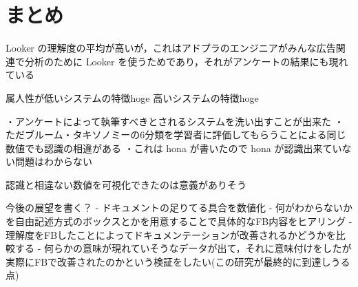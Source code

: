 \section{まとめ}
Looker の理解度の平均が高いが，これはアドプラのエンジニアがみんな広告関連で分析のために Looker を使うためであり，それがアンケートの結果にも現れている



属人性が低いシステムの特徴hoge
高いシステムの特徴hoge

・アンケートによって執筆すべきとされるシステムを洗い出すことが出来た
・ただブルーム・タキソノミーの6分類を学習者に評価してもらうことによる同じ数値でも認識の相違がある
・これは hona が書いたので hona が認識出来ていない問題はわからない


認識と相違ない数値を可視化できたのは意義がありそう


今後の展望を書く？
- ドキュメントの足りてる具合を数値化
- 何がわからないかを自由記述方式のボックスとかを用意することで具体的なFB内容をヒアリング
- 理解度をFBしたことによってドキュメンテーションが改善されるかどうかを比較する
- 何らかの意味が現れていそうなデータが出て，それに意味付けをしたが実際にFBで改善されたのかという検証をしたい(この研究が最終的に到達しうる点)
